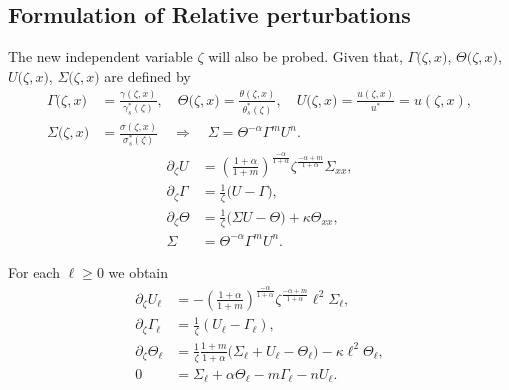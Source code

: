 \documentclass[a4paper,11pt]{article}
\def\l{{\ell}}
\theoremstyle{remark}
\begin{document}
\subsection{Formulation of Relative perturbations}
The new independent variable $\zeta$ will also be probed. Given that, $\Gamma\big(\zeta,x\big)$, $\Theta\big(\zeta,x\big)$, $U\big(\zeta,x\big)$, $\Sigma\big(\zeta,x\big)$ are defined by \begin{equation*}
 \begin{aligned}
  \Gamma\big(\zeta,x\big)&=\frac{\gamma(\zeta,x)}{\gamma^*_s(\zeta)}, \quad \Theta\big(\zeta,x\big)=\frac{\theta(\zeta,x)}{\theta^*_s(\zeta)}, \quad U\big(\zeta,x\big)=\frac{u(\zeta,x)}{u^*}=u(\zeta,x),\\
  \Sigma\big(\zeta,x\big)&=\frac{\sigma(\zeta,x)}{\sigma^*_s(\zeta)} \quad \Longrightarrow \quad \Sigma = \Theta^{-\alpha}\Gamma^m U^n.
 \end{aligned}
\end{equation*}
\begin{equation}
 \begin{aligned}
  \partial_\zeta U &= \left( \frac{1+\alpha}{1+m}\right)^{\frac{-\alpha}{1+\alpha}}\zeta^{\frac{-\alpha+m}{1+\alpha}} \Sigma_{xx},\\
  \partial_\zeta \Gamma &= \frac{1}{\zeta} \Big(U-\Gamma\Big),\\
  \partial_\zeta \Theta &= \frac{1}{\zeta}\Big(\Sigma U - \Theta\Big) + \kappa\Theta_{xx}, \\
  \Sigma&=\Theta^{-\alpha}\Gamma^m U^n.
 \end{aligned}
\end{equation}

For each $\ell\ge0$ we obtain
\begin{equation} \label{eq:l-system_heat}
 \begin{aligned}
  \partial_\zeta U_\ell &= -\left(\frac{1+\alpha}{1+m}\right)^{\frac{-\alpha}{1+\alpha}}\zeta^{\frac{-\alpha+m}{1+\alpha}}\l^2 \Sigma_\ell,\\
  \partial_\zeta\Gamma_\ell &= \frac{1}{\zeta}(U_\ell-\Gamma_\ell),\\
  \partial_\zeta\Theta_\ell &= \frac{1}{\zeta}\frac{1+m}{1+\alpha}\Big(\Sigma_\ell+ U_\ell -\Theta_\ell\Big) - \kappa\l^2\Theta_\ell,\\
  0&=\Sigma_\ell + \alpha\Theta_\ell -m\Gamma_\ell - nU_\ell .
 \end{aligned}
\end{equation}
\end{document}
